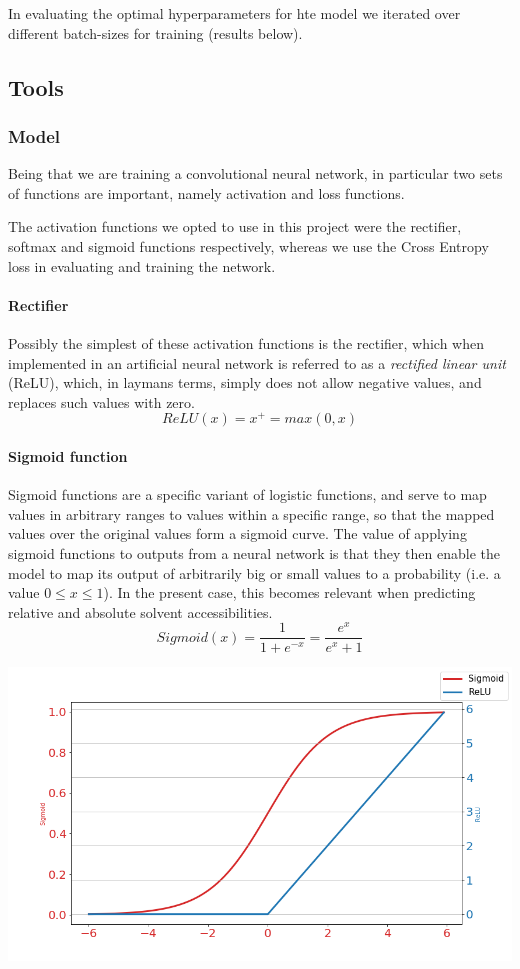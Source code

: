 \begin{multicols}{2}
In evaluating the optimal hyperparameters for hte model we iterated over different batch-sizes for training (results below).

\subsection{Tools}
\subsubsection{Model}
Being that we are training a convolutional neural network, in particular two sets of functions are important, namely activation and loss functions.

The activation functions we opted to use in this project were the rectifier, softmax and sigmoid functions respectively, whereas we use the Cross Entropy loss in evaluating and training the network.
\paragraph{Rectifier}
Possibly the simplest of these activation functions is the rectifier, which when implemented in an artificial neural network is referred to as a \textit{rectified linear unit} (ReLU), which, in laymans terms, simply does not allow negative values, and replaces such values with zero.
\[
ReLU(x) = x^+ = max(0,x)
\]

\paragraph{Sigmoid function}
Sigmoid functions are a specific variant of logistic functions, and serve to map values in arbitrary ranges to values within a specific range, so that the mapped values over the original values form a sigmoid curve. The value of applying sigmoid functions to outputs from a neural network is that they then enable the model to map its output of arbitrarily big or small values to a probability (i.e. a value $0\leq x \leq 1$). In the present case, this becomes relevant when predicting relative and absolute solvent accessibilities.
\[
Sigmoid(x) = \frac{1}{1 + e^{-x}} = \frac{e^x}{e^x +1}
\]

\begin{Figure}
 \centering
 \includegraphics[width=\linewidth]{../graphs/activation.png}
 \captionsetup{width=0.8\linewidth, font=small}
\end{Figure}


\end{multicols}
